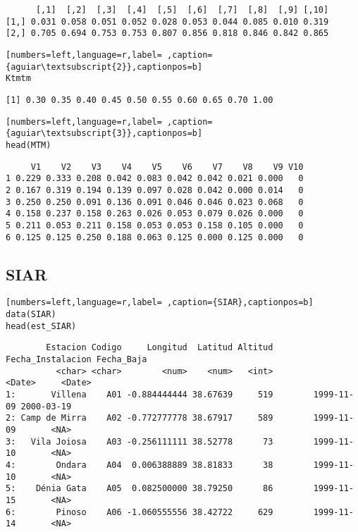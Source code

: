 \begin{verbatim}
      [,1]  [,2]  [,3]  [,4]  [,5]  [,6]  [,7]  [,8]  [,9] [,10]
[1,] 0.031 0.058 0.051 0.052 0.028 0.053 0.044 0.085 0.010 0.319
[2,] 0.705 0.694 0.753 0.753 0.807 0.856 0.818 0.846 0.842 0.865
\end{verbatim}


\begin{lstlisting}[numbers=left,language=r,label= ,caption={aguiar\textsubscript{2}},captionpos=b]
Ktmtm
\end{lstlisting}

\begin{verbatim}
[1] 0.30 0.35 0.40 0.45 0.50 0.55 0.60 0.65 0.70 1.00
\end{verbatim}


\begin{lstlisting}[numbers=left,language=r,label= ,caption={aguiar\textsubscript{3}},captionpos=b]
head(MTM)
\end{lstlisting}

\begin{verbatim}
     V1    V2    V3    V4    V5    V6    V7    V8    V9 V10
1 0.229 0.333 0.208 0.042 0.083 0.042 0.042 0.021 0.000   0
2 0.167 0.319 0.194 0.139 0.097 0.028 0.042 0.000 0.014   0
3 0.250 0.250 0.091 0.136 0.091 0.046 0.046 0.023 0.068   0
4 0.158 0.237 0.158 0.263 0.026 0.053 0.079 0.026 0.000   0
5 0.211 0.053 0.211 0.158 0.053 0.053 0.158 0.105 0.000   0
6 0.125 0.125 0.250 0.188 0.063 0.125 0.000 0.125 0.000   0
\end{verbatim}

\subsection{SIAR}
\label{sec:org18135c7}
\label{subsec:siar}
\begin{lstlisting}[numbers=left,language=r,label= ,caption={SIAR},captionpos=b]
data(SIAR)
head(est_SIAR)
\end{lstlisting}

\begin{verbatim}
        Estacion Codigo     Longitud  Latitud Altitud Fecha_Instalacion Fecha_Baja
          <char> <char>        <num>    <num>   <int>            <Date>     <Date>
1:       Villena    A01 -0.884444444 38.67639     519        1999-11-09 2000-03-19
2: Camp de Mirra    A02 -0.772777778 38.67917     589        1999-11-09       <NA>
3:   Vila Joiosa    A03 -0.256111111 38.52778      73        1999-11-10       <NA>
4:        Ondara    A04  0.006388889 38.81833      38        1999-11-10       <NA>
5:    Dénia Gata    A05  0.082500000 38.79250      86        1999-11-15       <NA>
6:        Pinoso    A06 -1.060555556 38.42722     629        1999-11-14       <NA>
\end{verbatim}

